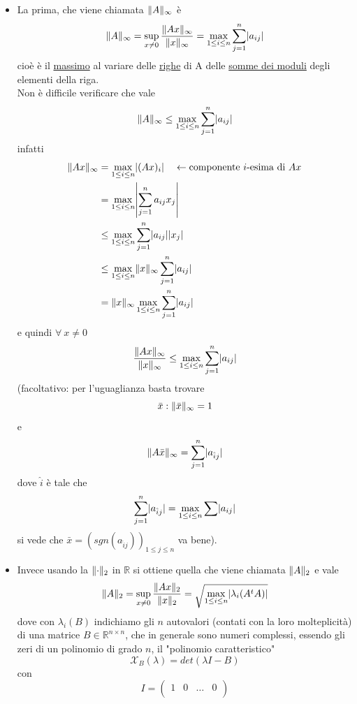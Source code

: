 \documentclass[12pt,a4paper]{article}
\DeclarePairedDelimiter{\abs}{\lvert}{\rvert}
\DeclarePairedDelimiter{\norma}{\lVert}{\rVert}
\begin{document}
\begin{itemize}
    \item La prima, che viene chiamata $\norma{A}_{\infty}$ è
    \[\norma{A}_{\infty} = \sup_{x \ne 0} \frac{\norma{Ax}_{\infty}}{\norma{x}_{\infty}} = \max_{1 \le i \le n} \sum_{j=1}^n \abs{a_{ij}}\]
    cioè è il \underline{massimo} al variare delle \underline{righe} di A delle \underline{somme dei moduli} degli elementi della riga.\\
    Non è difficile verificare che vale
    \[\norma{A}_{\infty} \le \max_{1 \le i \le n} \sum_{j=1}^n \abs{a_{ij}}\]
    infatti
    \[\begin{split}
        \norma{Ax}_{\infty} & = \max_{1 \le i \le n} \abs{(Ax)_i} \quad \leftarrow \text{componente } i\text{-esima di } Ax\\
        & = \max_{1 \le i \le n} \abs*{\sum_{j = 1}^n a_{ij}x_j} \\
        & \le \max_{1 \le i \le n} \sum_{j = 1}^n \abs{a_{ij}}\abs{x_j} \\
        & \le \max_{1 \le i \le n} \norma{x}_{\infty} \sum_{j = 1}^n \abs{a_{ij}} \\
        & = \norma{x}_{\infty} \max_{1 \le i \le n} \sum_{j = 1}^n \abs{a_{ij}}
    \end{split}\]
    e quindi $\forall \ x \ne 0$
    \[\frac{\norma{Ax}_{\infty}}{\norma{x}_{\infty}} \le \max_{1 \le i \le n} \sum_{j = 1}^n \abs{a_{ij}}\]
    (facoltativo: per l'uguaglianza basta trovare 
    \[\bar x : \norma{\bar x}_{\infty} = 1\] e 
    \[\norma{A \bar x}_{\infty} = \sum_{j = 1}^n \abs{a_{\hat{i}j}}\]
    dove $\hat{i}$ è tale che
    \[\sum_{j = 1}^n \abs{a_{\hat{i}j}} = \max_{1 \le i \le n} \sum \abs{a_{ij}}\]
    si vede che $\bar x = (sgn(a_{\hat{i}j}))_{1 \le j \le n}$ va bene).
    \item Invece usando la $\norma{\cdot}_2$ in $\mathbb{R}$ si ottiene quella che viene chiamata $\norma{A}_2$ e vale
    \[\norma{A}_2 = \sup_{x \ne 0} \frac{\norma{Ax}_2}{\norma{x}_2} = \sqrt{\max_{1 \le i \le n} \abs*{\lambda_i (A^t A)}}\]
    dove con $\lambda_i (B)$ indichiamo gli $n$ autovalori (contati con la loro molteplicità) di una matrice $B \in \mathbb{R}^{n \times n}$, che in generale sono numeri complessi, essendo gli zeri di un polinomio di grado $n$, il "polinomio caratteristico"
    \[\mathcal{X}_B(\lambda) = det(\lambda I - B)\] con
    \[I = \begin{pmatrix}
        1 & 0 & \dotso & 0 \\

\end{pmatrix}\]
\end{itemize}
\end{document}
